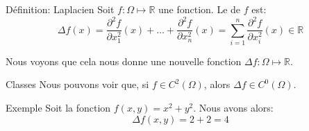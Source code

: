 \documentclass[a4paper]{article}
\begin{document}
\begin{parag}{Définition: Laplacien}
    Soit $f: \Omega \mapsto \mathbb{R}$ une fonction. Le  de $f$ est: 
    \[\Delta f\left(x\right) = \frac{\partial^{2} f}{\partial x_1^{2}}\left(x\right) + \ldots + \frac{\partial^{2} f}{\partial x_n^{2}}\left(x\right) = \sum_{i=1}^{n} \frac{\partial^{2} f}{\partial x_i^{2}}\left(x\right) \in \mathbb{R}\]

    Nous voyons que cela nous donne une nouvelle fonction $\Delta f : \Omega \mapsto \mathbb{R}$.

    \begin{subparag}{Classes}
        Nous pouvons voir que, si $f \in C^2\left(\Omega\right)$, alors $\Delta f \in C^0\left(\Omega\right)$.
    \end{subparag}

    \begin{subparag}{Exemple}
        Soit la fonction $f\left(x, y\right) = x^2 + y^2$. Nous avons alors: 
        \[\Delta f\left(x, y\right) = 2 + 2 = 4\]
    \end{subparag}
    
\end{parag}
\end{document}
